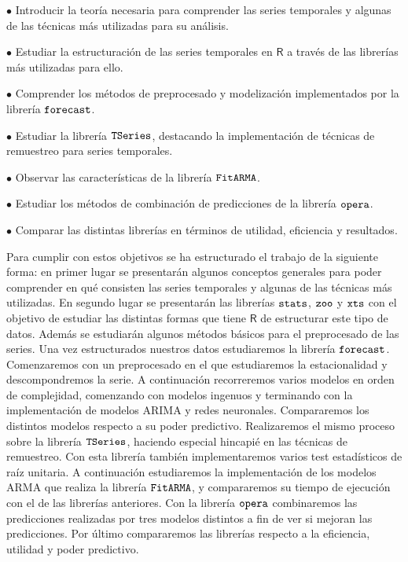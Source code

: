 \begin{itemize*}
  \item[$\bullet$]Introducir la teoría necesaria para comprender las series temporales y algunas de las técnicas más utilizadas para su análisis.
  \item[$\bullet$]Estudiar la estructuración de las series temporales en $\textsf{R}$ a través de las librerías más utilizadas para ello.
  \item[$\bullet$]Comprender los métodos de preprocesado y modelización implementados por la librería $\verb!forecast!$.
  \item[$\bullet$]Estudiar la librería $\verb!TSeries!$, destacando la implementación de técnicas de remuestreo para series temporales.
  \item[$\bullet$]Observar las características de la librería $\verb!FitARMA!$.
  \item[$\bullet$]Estudiar los métodos de combinación de predicciones de la librería $\verb!opera!$.
  \item[$\bullet$]Comparar las distintas librerías en términos de utilidad, eficiencia y resultados.
\end{itemize*}

Para cumplir con estos objetivos se ha estructurado el trabajo de la siguiente forma: en primer lugar se presentarán algunos conceptos generales para poder comprender en qué consisten las series temporales y algunas de las técnicas más utilizadas. En segundo lugar se presentarán las librerías $\verb!stats!$, $\verb!zoo!$ y $\verb!xts!$ con el objetivo de estudiar las distintas formas que tiene $\textsf{R}$ de estructurar este tipo de datos. Además se estudiarán algunos métodos básicos para el preprocesado de las series. Una vez estructurados nuestros datos estudiaremos la librería $\verb!forecast!$. Comenzaremos con un preprocesado en el que estudiaremos la estacionalidad y descompondremos la serie. A continuación recorreremos varios modelos en orden de complejidad, comenzando con modelos ingenuos y terminando con la implementación de modelos ARIMA y redes neuronales. Compararemos los distintos modelos respecto a su poder predictivo. Realizaremos el mismo proceso sobre la librería $\verb!TSeries!$, haciendo especial hincapié en las técnicas de remuestreo. Con esta librería también implementaremos varios test estadísticos de raíz unitaria. A continuación estudiaremos la implementación de los modelos ARMA que realiza la librería $\verb!FitARMA!$, y compararemos su tiempo de ejecución con el de las librerías anteriores. Con la librería $\verb!opera!$ combinaremos las predicciones realizadas por tres modelos distintos a fin de ver si mejoran las predicciones. Por último compararemos las librerías respecto a la eficiencia, utilidad y poder predictivo.

